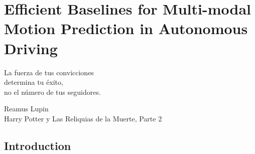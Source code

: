 % 
% 
% 
% 
% 
% 
% 

\chapter{Efficient Baselines for Multi-modal \\ Motion Prediction in Autonomous Driving}
\label{cha:efficient_baseline_for_mp_in_ad}

\begin{FraseCelebre}
	\begin{Frase}
		La fuerza de tus convicciones \\
		determina tu éxito, \\
		no el número de tus seguidores.
	\end{Frase}
	\begin{Fuente}
		Reamus Lupin \\
		Harry Potter y Las Reliquias de la Muerte, Parte 2
	\end{Fuente}
\end{FraseCelebre}

\section{Introduction}
\label{sec:6_introduction}

